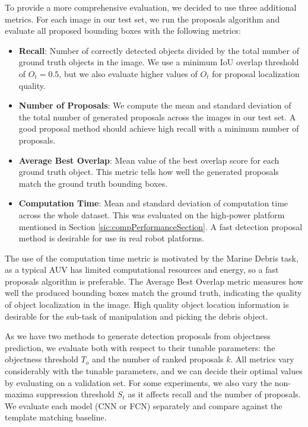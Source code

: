 To provide a more comprehensive evaluation, we decided to use three additional metrics. For each image in our test set, we run the proposals algorithm and evaluate all proposed bounding boxes with the following metrics:

\begin{itemize}
	\item \textbf{Recall}: Number of correctly detected objects divided by the total number of ground truth objects in the image. We use a minimum IoU overlap threshold of $O_t = 0.5$, but we also evaluate higher values of $O_t$ for proposal localization quality.
	\item \textbf{Number of Proposals}: We compute the mean and standard deviation of the total number of generated proposals across the images in our test set. A good proposal method should achieve high recall with a minimum number of proposals.
	\item \textbf{Average Best Overlap}: Mean value of the best overlap score for each ground truth object. This metric tells how well the generated proposals match the ground truth bounding boxes.
	\item \textbf{Computation Time}: Mean and standard deviation of computation time across the whole dataset. This was evaluated on the high-power platform mentioned in Section \ref{sic:compPerformanceSection}. A fast detection proposal method is desirable for use in real robot platforms.
\end{itemize}

The use of the computation time metric is motivated by the Marine Debris task, as a typical AUV has limited computational resources and energy, so a fast proposals algorithm is preferable. The Average Best Overlap  metric measures how well the produced bounding boxes match the ground truth, indicating the quality of object localization in the image. High quality object location information is desirable for the sub-task of manipulation and picking the debris object.

As we have two methods to generate detection proposals from objectness prediction, we evaluate both with respect to their tunable parameters: the objectness threshold $T_o$ and the number of ranked proposals $k$. All metrics vary considerably with the tunable parameters, and we can decide their optimal values by evaluating on a validation set. For some experiments, we also vary the non-maxima suppression threshold $S_t$ as it affects recall and the number of proposals. We evaluate each model (CNN or FCN) separately and compare against the template matching baseline.

